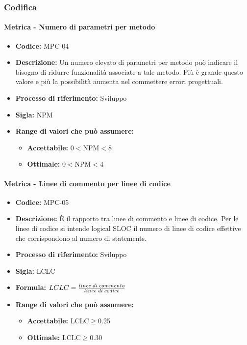 \subsubsection{Codifica}  
    \paragraph{Metrica - Numero di parametri per metodo} 
    \begin{itemize}
        \item \textbf{Codice:} MPC-04
        \item \textbf{Descrizione:} Un numero elevato di parametri per metodo può indicare il bisogno di ridurre funzionalità associate a tale metodo. Più è grande questo valore e più la possibilità aumenta nel commettere errori progettuali.
        \item \textbf{Processo di riferimento:} Sviluppo
        \item \textbf{Sigla:} NPM
        \item \textbf{Range di valori che può assumere:}
        \begin{itemize}
            \item \textbf{Accettabile:} 0$<$NPM$<$8
            \item \textbf{Ottimale:} 0$<$NPM$<$4
        \end{itemize}
    \end{itemize}

    \paragraph{Metrica - Linee di commento per linee di codice}
    \begin{itemize}
        \item \textbf{Codice:} MPC-05
        \item \textbf{Descrizione:} È il rapporto tra linee di commento e linee di codice. Per le linee di codice si intende logical SLOC il numero di linee di codice effettive che corrispondono al numero di statements.
        \item \textbf{Processo di riferimento:} Sviluppo
        \item \textbf{Sigla:} LCLC
        \item \textbf{Formula:} \begin{math}{LCLC = {linee \; di \; commento\over linee \; di \; codice}}\end{math}
        \item \textbf{Range di valori che può assumere:}
        \begin{itemize}
            \item \textbf{Accettabile:} LCLC$\geq$0.25
            \item \textbf{Ottimale:} LCLC$\geq$0.30
        \end{itemize}
    \end{itemize}

